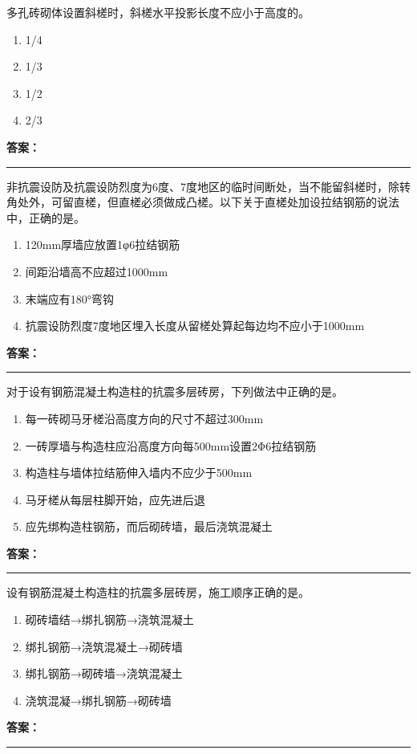 \documentclass[UTF8,fontset=fandol,11pt]{ctexart}
\newcommand{\answerline}{\textcolor{answerred}{\rule{2.4cm}{0.7pt}}}
\begin{document}
\begin{quizbox}[title={第 20 题}]
多孔砖砌体设置斜槎时，斜槎水平投影长度不应小于高度的。\\
\begin{enumerate}[label=\Alph*.]
\item 1/4
\item 1/3
\item 1/2
\item 2/3
\end{enumerate}
\textbf{\textcolor{answerred}{答案：}} \answerline
\end{quizbox}

\begin{quizbox}[title={第 21 题}]
非抗震设防及抗震设防烈度为6度、7度地区的临时间断处，当不能留斜槎时，除转角处外，可留直槎，但直槎必须做成凸槎。以下关于直槎处加设拉结钢筋的说法中，正确的是。\\
\begin{enumerate}[label=\Alph*.]
\item 120mm厚墙应放置1φ6拉结钢筋
\item 间距沿墙高不应超过1000mm
\item 末端应有180°弯钩
\item 抗震设防烈度7度地区埋入长度从留槎处算起每边均不应小于1000mm
\end{enumerate}
\textbf{\textcolor{answerred}{答案：}} \answerline
\end{quizbox}

\begin{quizbox}[title={第 22 题}]
对于设有钢筋混凝土构造柱的抗震多层砖房，下列做法中正确的是。\\
\begin{enumerate}[label=\Alph*.]
\item 每一砖砌马牙槎沿高度方向的尺寸不超过300mm
\item 一砖厚墙与构造柱应沿高度方向每500mm设置2Φ6拉结钢筋
\item 构造柱与墙体拉结筋伸入墙内不应少于500mm
\item 马牙槎从每层柱脚开始，应先进后退
\item 应先绑构造柱钢筋，而后砌砖墙，最后浇筑混凝土
\end{enumerate}
\textbf{\textcolor{answerred}{答案：}} \answerline
\end{quizbox}

\begin{quizbox}[title={第 23 题}]
设有钢筋混凝土构造柱的抗震多层砖房，施工顺序正确的是。\\
\begin{enumerate}[label=\Alph*.]
\item 砌砖墙结→绑扎钢筋→浇筑混凝土
\item 绑扎钢筋→浇筑混凝土→砌砖墙
\item 绑扎钢筋→砌砖墙→浇筑混凝土
\item 浇筑混凝→绑扎钢筋→砌砖墙
\end{enumerate}
\textbf{\textcolor{answerred}{答案：}} \answerline
\end{quizbox}
\end{document}
